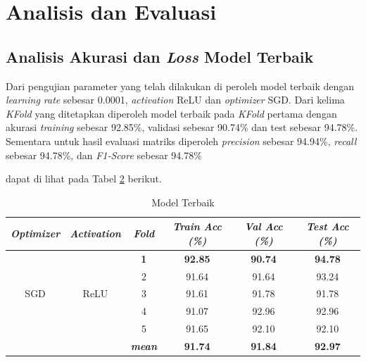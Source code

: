 \begin{table}[H]
\section{Analisis dan Evaluasi}
    \subsection{Analisis Akurasi dan \textit{Loss} Model Terbaik}

    Dari pengujian parameter yang telah dilakukan di peroleh model terbaik dengan \textit{learning rate} sebesar 0.0001, \textit{activation} ReLU dan \textit{optimizer} SGD. Dari kelima \textit{KFold} yang ditetapkan diperoleh model terbaik pada \textit{KFold} pertama dengan akurasi \textit{training} sebesar 92.85\%, validasi sebesar 90.74\% dan test sebesar 94.78\%. Sementara untuk hasil evaluasi matriks diperoleh \textit{precision} sebesar 94.94\%, \textit{recall} sebesar 94.78\%, dan \textit{F1-Score} sebesar 94.78\%
    
    
    
    dapat di lihat pada Tabel \ref{Model Terbaik} berikut.

    \begin{table}[H]
        \centering
        \caption{Model Terbaik}
        \begin{tabular}{cccccc}
            \toprule
            \textbf{\textit{Optimizer}} & \textbf{\textit{Activation}} &
            \multicolumn{1}{c}{\textit{\textbf{Fold}}} & \textbf{\textit{Train Acc (\%) } } & \textbf{\textit{Val Acc (\%)}} & \textbf{\textit{Test Acc (\%)}}\\
        
            \midrule
            \multirow{5}{*}{SGD} & \multirow{5}{*}{ReLU} 
            & \textbf{1} & \textbf{92.85 }& \textbf{90.74 }& \textbf{94.78} \\
            & & 2 & 91.64 & 91.64 & 93.24 \\
            & & 3 & 91.61 & 91.78 & 91.78 \\
            & & 4 & 91.07 & 92.96 & 92.96 \\
            & & 5 & 91.65 & 92.10 & 92.10  \\
            & &\multirow{1}{*}{\textit{\textbf{mean}}} & \textbf{91.74} & \textbf{91.84} &\textbf{92.97} \\ 
            \bottomrule
        \end{tabular}
        \label{Model Terbaik}
    \end{table}



\end{table}
